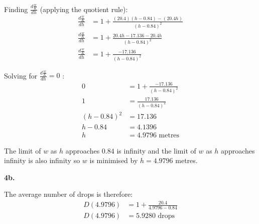 \documentclass[12pt,a4paper]{report}
\begin{document}
Finding \(\frac{d \frac{w}{K} } {dh} \) (applying the quotient rule):
\begingroup
\addtolength{\jot}{0.5em}
\begin{align}
\frac{d \frac{w}{K} } {dh} &=  1 + \frac{(20.4)(h-0.84) - (20.4h)}{(h-0.84)^2} \\
\frac{d \frac{w}{K} } {dh} &=  1 + \frac{20.4h-17.136 - 20.4h}{(h-0.84)^2} \\
\frac{d \frac{w}{K} } {dh} &=  1 + \frac{-17.136}{(h-0.84)^2} 
\end{align}
\endgroup

Solving for  \(\frac{d \frac{w}{K} } {dh} = 0 \) :
\begingroup
\addtolength{\jot}{0.5em}
\begin{align}
0 &=  1 + \frac{-17.136}{(h-0.84)^2}  \\
1 &=  \frac{17.136}{(h-0.84)^2} \\
 (h-0.84)^2 &= 17.136 \\
h-0.84 &= 4.1396   \\
h &= 4.9796 \text{ metres}
\end{align}
\endgroup


The limit of \(w\) as \(h\) approaches \(0.84\) is infinity and the limit of \(w\) as \(h\) approaches infinity is also infinity so \(w\) is minimised by \( h = 4.9796 \) metres.


\textbf{4b.}

The average number of drops is therefore:
\begingroup
\addtolength{\jot}{0.5em}
\begin{align}
D(4.9796) & = 1 + \frac{20.4}{4.9796-0.84} \\
D(4.9796) &= 5.9280 \text{ drops}
\end{align}
\endgroup
\end{document}
